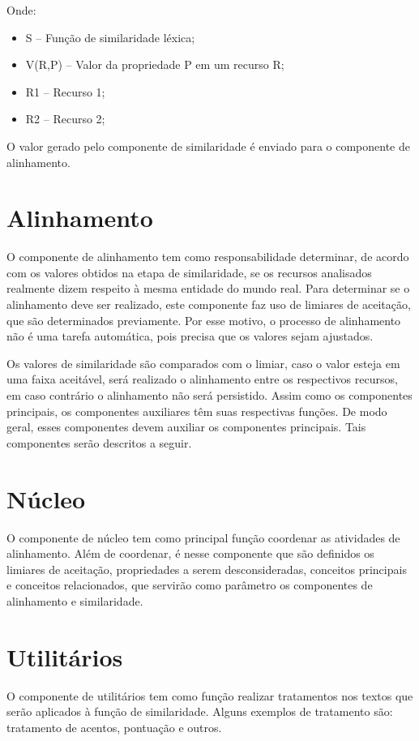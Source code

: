 Onde:

\begin{itemize}
	\item S – Função de similaridade léxica;
	\item V(R,P) – Valor da propriedade P em um recurso R;
	\item R1 – Recurso 1;
	\item R2 – Recurso 2;
\end{itemize}

O valor gerado pelo componente de similaridade é enviado para o componente de alinhamento.


\section*{Alinhamento}
O componente de alinhamento tem como responsabilidade determinar, de acordo com os valores obtidos na etapa de similaridade, se os recursos analisados realmente dizem respeito à mesma entidade do mundo real. Para determinar se o alinhamento deve ser realizado, este componente faz uso de limiares de aceitação, que são determinados previamente. Por esse motivo, o processo de alinhamento não é uma tarefa automática, pois precisa que os valores sejam ajustados.

Os valores de similaridade são comparados com o limiar, caso o valor esteja em uma faixa aceitável, será realizado o alinhamento entre os respectivos recursos, em caso contrário o alinhamento não será persistido. Assim como os componentes principais, os componentes auxiliares têm suas respectivas funções. De modo geral, esses componentes devem auxiliar os componentes principais. Tais componentes serão descritos a seguir.


\section*{Núcleo}
O componente de núcleo tem como principal função coordenar as atividades de alinhamento. Além de coordenar, é nesse componente que são definidos os limiares de aceitação, propriedades a serem desconsideradas, conceitos principais e conceitos relacionados, que servirão como parâmetro os componentes de alinhamento e similaridade.


\section*{Utilitários}
O componente de utilitários tem como função realizar tratamentos nos textos que serão aplicados à função de similaridade. Alguns exemplos de tratamento são: tratamento de acentos, pontuação e outros.

